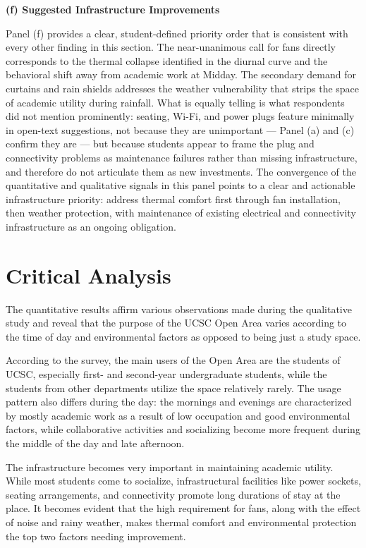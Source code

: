 \documentclass[12pt, a4paper]{report}
\begin{document}
\vspace{0.5cm}

\textbf{(f) Suggested Infrastructure Improvements}

Panel (f) provides a clear, student-defined priority order that is consistent with every other finding in this section. The near-unanimous call for fans directly corresponds to the thermal collapse identified in the diurnal curve and the behavioral shift away from academic work at Midday. The secondary demand for curtains and rain shields addresses the weather vulnerability that strips the space of academic utility during rainfall. What is equally telling is what respondents did not mention prominently: seating, Wi-Fi, and power plugs feature minimally in open-text suggestions, not because they are unimportant --- Panel (a) and (c) confirm they are --- but because students appear to frame the plug and connectivity problems as maintenance failures rather than missing infrastructure, and therefore do not articulate them as new investments. The convergence of the quantitative and qualitative signals in this panel points to a clear and actionable infrastructure priority: address thermal comfort first through fan installation, then weather protection, with maintenance of existing electrical and connectivity infrastructure as an ongoing obligation.
\vspace{0.5cm}

\chapter{Critical Analysis}
The quantitative results affirm various observations made during the qualitative study and reveal that the purpose of the UCSC Open Area varies according to the time of day and environmental factors as opposed to being just a study space.

According to the survey, the main users of the Open Area are the students of UCSC, especially first- and second-year undergraduate students, while the students from other departments utilize the space relatively rarely. The usage pattern also differs during the day: the mornings and evenings are characterized by mostly academic work as a result of low occupation and good environmental factors, while collaborative activities and socializing become more frequent during the middle of the day and late afternoon.

The infrastructure becomes very important in maintaining academic utility. While most students come to socialize, infrastructural facilities like power sockets, seating arrangements, and connectivity promote long durations of stay at the place. It becomes evident that the high requirement for fans, along with the effect of noise and rainy weather, makes thermal comfort and environmental protection the top two factors needing improvement.
\end{document}
